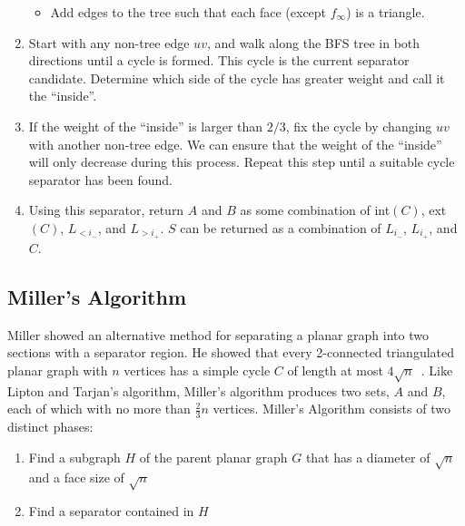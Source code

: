 \documentclass[11pt]{article}
\newtheorem{theorem}{Theorem}[section]
\begin{document}
\begin{enumerate}
\begin{itemize}
            \item Add edges to the tree such that each face (except $f_{\infty}$) is a triangle.
        \end{itemize}

        \item Start with any non-tree edge $uv$, and walk along the BFS tree in both directions until a cycle is formed. This cycle is the current separator candidate. Determine which side of the cycle has greater weight and call it the ``inside''.

        \item If the weight of the ``inside'' is larger than $2/3$, fix the cycle by changing $uv$ with another non-tree edge. We can ensure that the weight of the ``inside'' will only decrease during this process. Repeat this step until a suitable cycle separator has been found.

        \item Using this separator, return $A$ and $B$ as some combination of int$(C)$, ext$(C)$, $L_{< i_-}$, and $L_{> i_+}$. $S$ can be returned as a combination of $L_{i_-}$, $L_{i_+}$, and $C$.

    \end{enumerate}

    \subsection{Miller's Algorithm}
    \label{sec:graph-sep-miller}

    Miller showed an alternative method for separating a planar graph into two sections with a separator region. He showed that every 2-connected triangulated planar graph with $n$ vertices has a simple cycle $C$ of length at most $4\sqrt{n}$~\cite{miller1984finding}. Like Lipton and Tarjan's algorithm, Miller's algorithm produces two sets, $A$ and $B$, each of which with no more than $\frac{2}{3}n$ vertices. Miller's Algorithm consists of two distinct phases:
    \begin{enumerate}
      \item Find a subgraph $H$ of the parent planar graph $G$ that has a diameter of $\sqrt{n}$ and a face size of $\sqrt{n}$

      \item Find a separator contained in $H$
    \end{enumerate}

\end{document}
